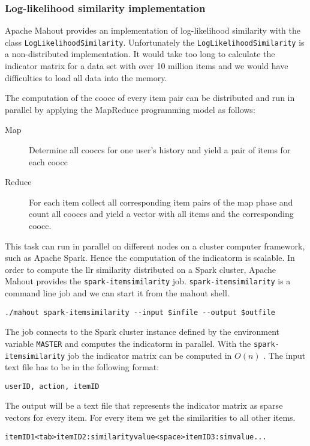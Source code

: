 \subsubsection{Log-likelihood similarity implementation}
\label{sec:llrimpl}

Apache Mahout provides an implementation of log-likelihood similarity with the class \verb|LogLikelihoodSimilarity|. Unfortunately the \verb|LogLikelihoodSimilarity| is a non-distributed implementation. It would take too long to calculate the indicator matrix for a data set with over 10 million items and we would have difficulties to load all data into the memory. 

The computation of the \gls{coocc} of every item pair can be distributed and run in parallel by applying the MapReduce programming model as follows:
\begin{description}
\item[Map] Determine all \glspl{coocc} for one user's history and yield a pair of items for each \gls{coocc}
\item[Reduce] For each item collect all corresponding item pairs of the map phase and count all \glspl{coocc} and yield a vector with all items and the corresponding \gls{coocc}.
\end{description}

This task can run in parallel on different nodes on a cluster computer framework, such as Apache Spark. Hence the computation of the \gls{indicatorm} is \gls{scalable}.
In order to compute the \gls{llr} similarity distributed on a Spark cluster, Apache Mahout provides the \verb|spark-itemsimilarity| job. 
\verb|spark-itemsimilarity| is a command line job and we can start it from the mahout shell.
\begin{verbatim}
./mahout spark-itemsimilarity --input $infile --output $outfile
\end{verbatim}
The job connects to the Spark cluster instance defined by the environment variable \verb|MASTER| and computes the \gls{indicatorm} in parallel. With the \verb|spark-itemsimilarity| job the indicator matrix can be computed in $O(n)$ \cite{Schelter}. 
The input text file has to be in the following format:
\begin{verbatim}
userID, action, itemID
\end{verbatim}
The output will be a text file that represents the indicator matrix as sparse vectors for every item. For every item we get the similarities to all other items.
\begin{verbatim}
itemID1<tab>itemID2:similarityvalue<space>itemID3:simvalue...
\end{verbatim}

